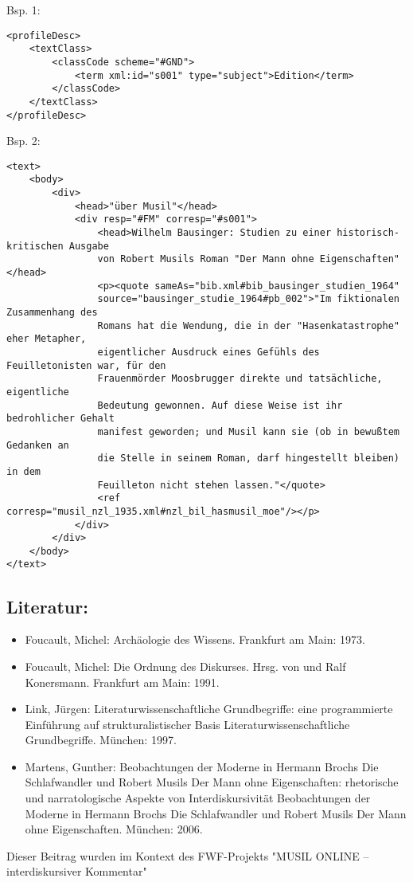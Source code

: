 \documentclass{article}
\begin{document}
        Bsp. 1:\\
            
        \begin{verbatim}<profileDesc>
    <textClass>
        <classCode scheme="#GND">
            <term xml:id="s001" type="subject">Edition</term>
        </classCode>
    </textClass>
</profileDesc>\end{verbatim}Bsp. 2:\\
            
        \begin{verbatim}<text>
    <body>
        <div>
            <head>"über Musil"</head>
            <div resp="#FM" corresp="#s001">
                <head>Wilhelm Bausinger: Studien zu einer historisch-kritischen Ausgabe
                von Robert Musils Roman "Der Mann ohne Eigenschaften"</head>
                <p><quote sameAs="bib.xml#bib_bausinger_studien_1964"
                source="bausinger_studie_1964#pb_002">"Im fiktionalen Zusammenhang des 
                Romans hat die Wendung, die in der "Hasenkatastrophe" eher Metapher, 
                eigentlicher Ausdruck eines Gefühls des Feuilletonisten war, für den 
                Frauenmörder Moosbrugger direkte und tatsächliche, eigentliche 
                Bedeutung gewonnen. Auf diese Weise ist ihr bedrohlicher Gehalt 
                manifest geworden; und Musil kann sie (ob in bewußtem Gedanken an 
                die Stelle in seinem Roman, darf hingestellt bleiben) in dem 
                Feuilleton nicht stehen lassen."</quote> 
                <ref corresp="musil_nzl_1935.xml#nzl_bil_hasmusil_moe"/></p>
            </div>
        </div>
    </body>
</text>\end{verbatim}\subsection*{Literatur:}\begin{itemize}\item Foucault, Michel: Archäologie des Wissens. Frankfurt am Main: 1973.\item Foucault, Michel: Die Ordnung des Diskurses. Hrsg. von  und Ralf Konersmann. Frankfurt am Main: 1991.\item Link, Jürgen: Literaturwissenschaftliche Grundbegriffe: eine
                              programmierte Einführung auf strukturalistischer Basis Literaturwissenschaftliche Grundbegriffe. München: 1997.\item Martens, Gunther: Beobachtungen der Moderne in Hermann Brochs Die
                              Schlafwandler und Robert Musils Der Mann ohne Eigenschaften:
                              rhetorische und narratologische Aspekte von Interdiskursivität Beobachtungen der Moderne in Hermann Brochs Die
                              Schlafwandler und Robert Musils Der Mann ohne Eigenschaften. München: 2006.\end{itemize}Dieser Beitrag wurden im Kontext des FWF-Projekts "MUSIL ONLINE – interdiskursiver Kommentar" 
\end{document}
